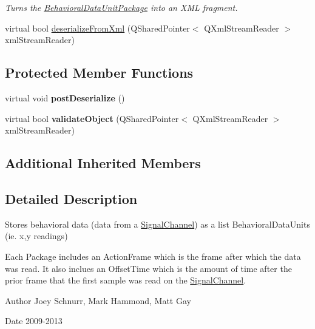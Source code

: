 \begin{DoxyCompactItemize}
\begin{DoxyCompactList}\small\item\em Turns the \hyperlink{class_picto_1_1_behavioral_data_unit_package}{Behavioral\-Data\-Unit\-Package} into an X\-M\-L fragment. \end{DoxyCompactList}\item 
virtual bool \hyperlink{class_picto_1_1_behavioral_data_unit_package_ad072de1e2e515ffb022b1803370ed435}{deserialize\-From\-Xml} (Q\-Shared\-Pointer$<$ Q\-Xml\-Stream\-Reader $>$ xml\-Stream\-Reader)
\end{DoxyCompactItemize}
\subsection*{Protected Member Functions}
\begin{DoxyCompactItemize}
\item 
\hypertarget{class_picto_1_1_behavioral_data_unit_package_a497c73e3ffe801360fa85f9353914740}{virtual void {\bfseries post\-Deserialize} ()}\label{class_picto_1_1_behavioral_data_unit_package_a497c73e3ffe801360fa85f9353914740}

\item 
\hypertarget{class_picto_1_1_behavioral_data_unit_package_af5b7a952001c7ec2c605850ed0b53795}{virtual bool {\bfseries validate\-Object} (Q\-Shared\-Pointer$<$ Q\-Xml\-Stream\-Reader $>$ xml\-Stream\-Reader)}\label{class_picto_1_1_behavioral_data_unit_package_af5b7a952001c7ec2c605850ed0b53795}

\end{DoxyCompactItemize}
\subsection*{Additional Inherited Members}


\subsection{Detailed Description}
Stores behavioral data (data from a \hyperlink{class_picto_1_1_signal_channel}{Signal\-Channel}) as a list Behavioral\-Data\-Units (ie. x,y readings) 

Each Package includes an Action\-Frame which is the frame after which the data was read. It also inclues an Offset\-Time which is the amount of time after the prior frame that the first sample was read on the \hyperlink{class_picto_1_1_signal_channel}{Signal\-Channel}. \begin{DoxyAuthor}{Author}
Joey Schnurr, Mark Hammond, Matt Gay 
\end{DoxyAuthor}
\begin{DoxyDate}{Date}
2009-\/2013 
\end{DoxyDate}



